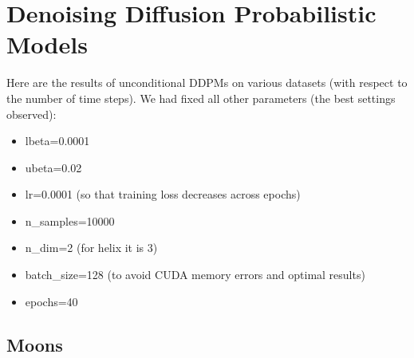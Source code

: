\documentclass[a4paper,12pt]{article}
\title{\cooltitle{CS726 Programming Assignment -- 2 Report}}
\author{
\textbf{Saksham Rathi (22B1003)}\\
\textbf{Sharvanee Sonawane (22B0943)}\\
\textbf{Deeksha Dhiwakar (22B0988)}\\
\small Department of Computer Science, \\
Indian Institute of Technology Bombay \\}
\date{}
\begin{document}
\maketitle

\section*{Denoising Diffusion Probabilistic Models}

Here are the results of unconditional DDPMs on various datasets (with respect to the number of time steps). We had fixed all other parameters (the best settings observed):

\begin{itemize}
  \item lbeta=0.0001
  \item ubeta=0.02
  \item lr=0.0001 (so that training loss decreases across epochs)
  \item n\_samples=10000
  \item n\_dim=2 (for helix it is 3)
  \item batch\_size=128 (to avoid CUDA memory errors and optimal results)
  \item epochs=40
\end{itemize}

\clearpage
\subsection*{Moons}
\end{document}
